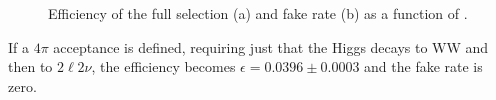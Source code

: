 \begin{figure}[t]
\centering
{}
\caption{Efficiency of the full selection (a) and fake rate (b) as a function of \pth.\label{fig:sel_eff}}
\end{figure}

If a $4\pi$ acceptance is defined, requiring just that the Higgs decays to WW and then to $2\ell2\nu$, the efficiency becomes $\epsilon=0.0396\pm{0.0003}$ and the fake rate is zero. 





